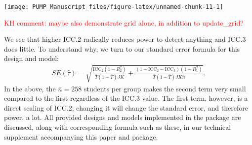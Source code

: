 \documentclass[
]{article}
\newenvironment{Shaded}{\begin{snugshade}}{\end{snugshade}}
\newcommand{\AttributeTok}[1]{\textcolor[rgb]{0.77,0.63,0.00}{#1}}
\newcommand{\DecValTok}[1]{\textcolor[rgb]{0.00,0.00,0.81}{#1}}
\newcommand{\FloatTok}[1]{\textcolor[rgb]{0.00,0.00,0.81}{#1}}
\newcommand{\FunctionTok}[1]{\textcolor[rgb]{0.00,0.00,0.00}{#1}}
\newcommand{\NormalTok}[1]{#1}
\newcommand{\OtherTok}[1]{\textcolor[rgb]{0.56,0.35,0.01}{#1}}
\newcommand{\SpecialCharTok}[1]{\textcolor[rgb]{0.00,0.00,0.00}{#1}}
\newcommand{\StringTok}[1]{\textcolor[rgb]{0.31,0.60,0.02}{#1}}
\begin{document}
\begin{Shaded}
\end{Shaded}

\begin{center}\texttt{[image: PUMP\_Manuscript\_files/figure-latex/unnamed-chunk-11-1]} \end{center}

\textcolor{red}{KH comment: maybe also demonstrate grid alone, in addition to update\_grid?}

We see that higher ICC.2 radically reduces power to detect anything and
ICC.3 does little. To understand why, we turn to our standard error
formula for this design and model: \[
\begin{aligned}
SE( \hat{\tau} ) = \sqrt{
\frac{\text{ICC}_{2}(1 - R^2_{2})}{\bar{T}(1 - \bar{T}) JK} +
\frac{(1-\text{ICC}_{2} - \text{ICC}_{3})(1-R^2_{1})}{\bar{T}(1 - \bar{T}) J K\bar{n}} } .
\end{aligned}
\] In the above, the \(\bar{n} = 258\) students per group makes the
second term very small compared to the first regardless of the ICC.3
value. The first term, however, is a direct scaling of ICC.2; changing
it will change the standard error, and therefore power, a lot. All
provided designs and models implemented in the package are discussed,
along with corresponding formula such as these, in our technical
supplement accompanying this paper and package.
\end{document}
